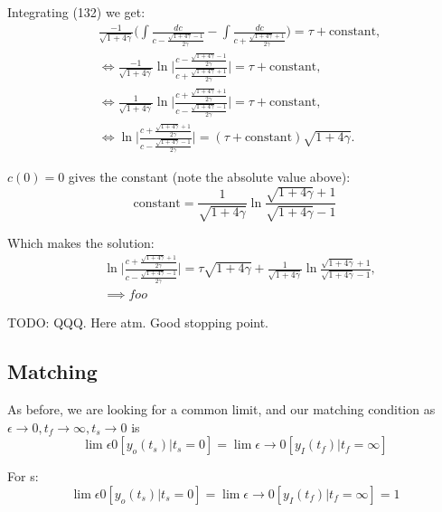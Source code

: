 \documentclass[12pt]{article}
\begin{document}
Integrating (132) we get:
\begin{align}
&\frac{-1}{\sqrt{1+4 \gamma}}
\Big( \int \frac{dc}{c - \frac{\sqrt{1+4 \gamma} - 1}{2 \gamma}} -
      \int \frac{dc}{c + \frac{\sqrt{1+4 \gamma} + 1}{2 \gamma}}
\Big) = \tau + \text{constant}, \\
&\iff \frac{-1}{\sqrt{1+4 \gamma}}
      \ln \bigg|\frac{c - \frac{\sqrt{1+4\gamma}-1}{2\gamma}}
                     {c + \frac{\sqrt{1+4\gamma}+1}{2\gamma}} \bigg|
 = \tau + \text{constant}, \\
&\iff \frac{1}{\sqrt{1+4 \gamma}}
      \ln \bigg|\frac{c + \frac{\sqrt{1+4\gamma}+1}{2\gamma}}
                     {c - \frac{\sqrt{1+4\gamma}-1}{2\gamma}} \bigg|
 = \tau + \text{constant}, \\
&\iff  \ln \bigg|\frac{c + \frac{\sqrt{1+4\gamma}+1}{2\gamma}}
                     {c - \frac{\sqrt{1+4\gamma}-1}{2\gamma}} \bigg|
 = (\tau + \text{constant}) \sqrt{1+4 \gamma}.
\end{align}

$c(0)=0$ gives the constant (note the absolute value above):
\begin{equation}
\text{constant} =
\frac{1}{\sqrt{1+4\gamma}} \ln \frac{\sqrt{1+4\gamma}+1}{{\sqrt{1+4\gamma}-1}}
\end{equation}

Which makes the solution:
\begin{align}
&\ln \bigg|\frac{c + \frac{\sqrt{1+4\gamma}+1}{2\gamma}}
               {c - \frac{\sqrt{1+4\gamma}-1}{2\gamma}} \bigg|
 = \tau \sqrt{1+4 \gamma} +
   \frac{1}{\sqrt{1+4\gamma}}\ln \frac{\sqrt{1+4\gamma}+1}{{\sqrt{1+4\gamma}-1}},\\
&\implies foo
\end{align}


TODO: QQQ. Here atm. Good stopping point.

\subsection{Matching}

As before, we are looking for a common limit, and our matching condition as
$\epsilon \to 0, t_f \to \infty, t_s \to 0$ is
\begin{equation}
\lim \epsilon 0 [y_o(t_s)|t_s=0] = \lim \epsilon \to 0[y_I(t_f)|t_f=\infty]
\end{equation}

For s:
\begin{equation}
\lim \epsilon 0 [y_o(t_s)|t_s=0] = \lim \epsilon \to 0[y_I(t_f)|t_f=\infty] = 1
\end{equation}
\end{document}
